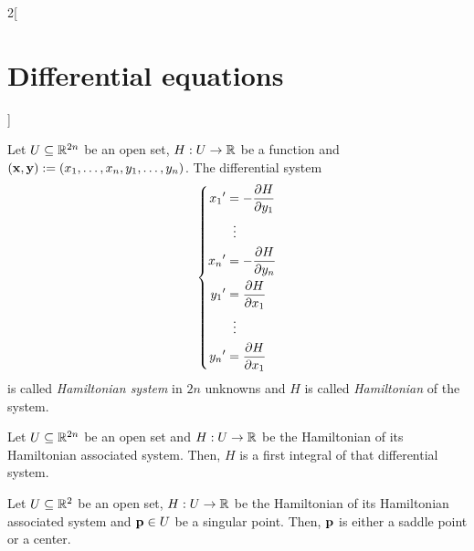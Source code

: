 \documentclass[../../../main_math.tex]{subfiles}
\begin{document}
\begin{multicols}{2}[\section{Differential equations}]
\begin{proposition}
  \end{proposition}
  \begin{definition}
    Let $U\subseteq \mathbb{R}^{2n}$ be an open set, $H:U\rightarrow\mathbb{R}$ be a function and $(\boldsymbol{\mathrm{x}},\boldsymbol{\mathrm{y}}):=(x_1,\ldots,x_n,y_1,\ldots,y_n)$. The differential system
    \begin{equation*}
      \left\{
      \begin{aligned}
        {x_1}' & =-\pdv{H}{y_1}(\boldsymbol{\mathrm{x}}) \\
               & \;\;\vdots             \\
        {x_n}' & =-\pdv{H}{y_n}(\boldsymbol{\mathrm{x}}) \\
        {y_1}' & =\pdv{H}{x_1}(\boldsymbol{\mathrm{x}})  \\
               & \;\;\vdots             \\
        {y_n}' & =\pdv{H}{x_1}(\boldsymbol{\mathrm{x}})  \\
      \end{aligned}
      \right.
    \end{equation*}
    is called \emph{Hamiltonian system} in $2n$ unknowns and $H$ is called \emph{Hamiltonian} of the system.
  \end{definition}
  \begin{proposition}
    Let $U\subseteq \mathbb{R}^{2n}$ be an open set and $H:U\rightarrow\mathbb{R}$ be the Hamiltonian of its Hamiltonian associated system. Then, $H$ is a first integral of that differential system.
  \end{proposition}
  \begin{theorem}
    Let $U\subseteq \mathbb{R}^{2}$ be an open set, $H:U\rightarrow\mathbb{R}$ be the Hamiltonian of its Hamiltonian associated system and $\boldsymbol{\mathrm{p}}\in U$ be a singular point. Then, $\boldsymbol{\mathrm{p}}$ is either a saddle point or a center.
  \end{theorem}

\end{multicols}
\end{document}
